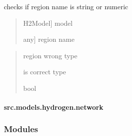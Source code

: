 \documentclass[letterpaper,10pt,english]{sphinxmanual}
\begin{document}
\begin{fulllineitems}
\label{\detokenize{src.models.hydrogen.model.validators:src.models.hydrogen.model.validators.region_validator}}
\pysigstartsignatures
\pysiglinewithargsret
{}
{\sphinxparamcomma {}}
{}
\pysigstopsignatures
\sphinxAtStartPar
checks if region name is string or numeric
\begin{quote}
\begin{description}
\sphinxlineitem{hm}{[}H2Model{]}
\sphinxAtStartPar
model

\sphinxlineitem{region}{[}any{]}
\sphinxAtStartPar
region name

\end{description}
\end{quote}
\begin{quote}\begin{description}
\sphinxAtStartPar
{} \textendash{} region wrong type

\sphinxAtStartPar
is correct type

\sphinxAtStartPar
bool

\end{description}\end{quote}

\end{fulllineitems}


\sphinxstepscope


\paragraph{src.models.hydrogen.network}
\label{\detokenize{src.models.hydrogen.network:module-src.models.hydrogen.network}}\label{\detokenize{src.models.hydrogen.network:src-models-hydrogen-network}}\label{\detokenize{src.models.hydrogen.network::doc}}\subsubsection*{Modules}
\end{document}
